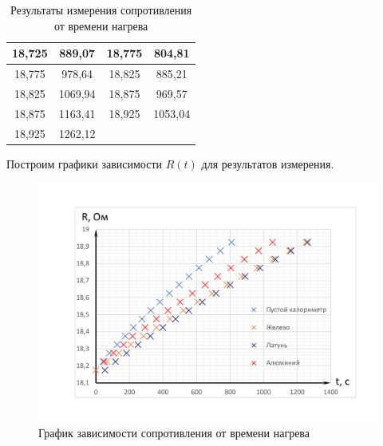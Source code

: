 \documentclass[12pt,a4paper]{article}
\begin{document}
\begin{table}[h!]
\begin{center}
\begin{tabular}{|p{3cm}|p{3cm}||p{3cm}p{3cm}|}
\multicolumn{1}{|c|}{18,725} & \multicolumn{1}{|c|}{889,07}  & \multicolumn{1}{|c|}{18,775} & \multicolumn{1}{|c|}{804,81}  \\ \hline
\multicolumn{1}{|c|}{18,775} & \multicolumn{1}{|c|}{978,64}  & \multicolumn{1}{|c|}{18,825} & \multicolumn{1}{|c|}{885,21}  \\ \hline
\multicolumn{1}{|c|}{18,825} & \multicolumn{1}{|c|}{1069,94} & \multicolumn{1}{|c|}{18,875} & \multicolumn{1}{|c|}{969,57}  \\ \hline
\multicolumn{1}{|c|}{18,875} & \multicolumn{1}{|c|}{1163,41} & \multicolumn{1}{|c|}{18,925} & \multicolumn{1}{|c|}{1053,04} \\ \hline
\multicolumn{1}{|c|}{18,925} & \multicolumn{1}{|c|}{1262,12} &\hfill
 \\  \cline{1-2}
\end{tabular}
\end{center}


\caption{Результаты измерения сопротивления от времени нагрева}
\label{tab:results_of_measuring_of_depence_resistance_for_time}
\end{table}

	\newpage
	
	Построим графики зависимости $R(t)$ для результатов измерения.
	
	\begin{figure}[h!]
		\begin{center}
			\includegraphics[width = \textwidth]{results_of_measuring}
			\caption{График зависимости сопротивления от времени нагрева}
			\label{fig:results_of_measuring}
		\end{center}
	\end{figure}
	
\end{document}
